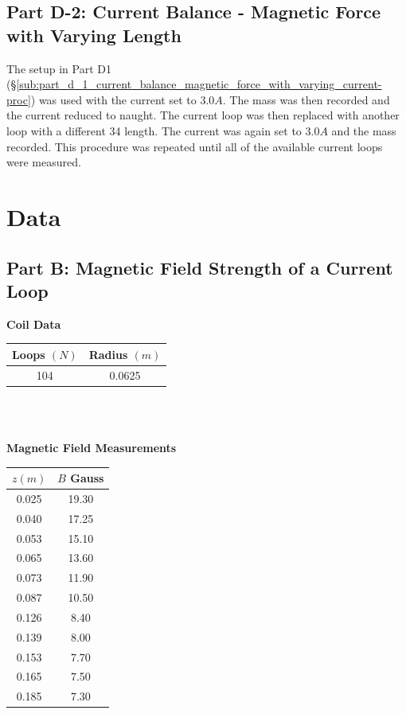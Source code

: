 \documentclass[titlepage]{article}
\begin{document}
\subsection{Part D-2: Current Balance - Magnetic Force with Varying Length}\label{sub:part_d_2_current_balance_magnetic_force_with_varying_length-proc}
The setup in Part D­1 (\S \ref{sub:part_d_1_current_balance_magnetic_force_with_varying_current-proc}) was used with the current set to $3.0A$.  The mass was then recorded and the current reduced to naught.  The current loop was then replaced with another loop with a different 3­4 length.  The current was again set to $3.0A$ and the mass recorded.  This procedure was repeated until all of the available current loops were measured.

\section{Data}\label{sec:data}

\subsection{Part B: Magnetic Field Strength of a Current Loop}\label{sub:part_b_magnetic_field_strength_of_a_current_loop-data}
\begin{center}\label{tbl1}
	\textbf{Coil Data}\\
	\begin{tabular}{cc}
	\hline
	Loops $(N)$ & Radius $(m)$\\
	\hline
	104 & 0.0625\\
	\hline
	\end{tabular}
\end{center}\\
\\
\begin{center}\label{tbl2}
	\textbf{Magnetic Field Measurements}\\
	\begin{tabular}{cc}
	\hline
	$z(m)$ & $B$ Gauss\\
	\hline
	0.025 & 19.30\\
	\hline
	0.040 & 17.25\\
	\hline
	0.053 & 15.10\\
	\hline
	0.065 & 13.60\\
	\hline
	0.073 & 11.90\\
	\hline
	0.087 & 10.50\\
	\hline
	0.126 & 8.40\\
	\hline
	0.139 & 8.00\\
	\hline
	0.153 & 7.70\\
	\hline
	0.165 & 7.50\\
	\hline
	0.185 & 7.30\\
	\hline
	\end{tabular}
\end{center}
\end{document}
